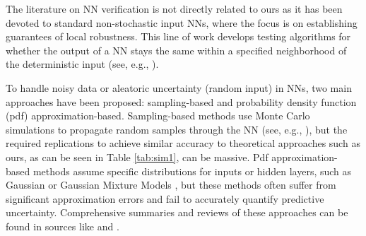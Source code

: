 \begin{comment}
To accommodate noisy data or aleatoric uncertainty (random input) in NNs directly, sampling-based and pdf approximation-based methods have been proposed. The former propagate randomness by mapping a set of samples through the NN based on which either features (e.g. moments) of the output distribution or the output distribution itself is derived. Monte Carlo simulation is used to draw random samples from the input  distribution, which are consequently propagated through the neural network to aggregate an output distribution. The training of large NNs is already computationally costly, and repeating this process a large number of times compounds the computational complexity without addressing the fundamental issue of the noise in the data deriving from their being a sample from a much larger population 
(see, e.g., \citet{Abdelazizetal2015,Jietal2020}). The core idea of pdf approximation-based methods is to assume the input, or the hidden layers of a NN have specific distributions. For example, \citet{Abdelazizetal2015} assume the distribution in each layer to be Gaussian and study their propagation through sigmoid NNs. \citet{ZhangShin2021} approximate input distributions with Gaussian Mixture Models. 
However, these methods suffer from significant approximation errors and are unable to accurately quantify predictive uncertainty in the NN output due to restrictive assumptions about the distributions in the input, their parameters, and hidden, or output layer. %
A summary of approaches to uncertainty estimation in neural networks can be found in \cite{Sickingetal2022} and a review in \cite{Gawlikowskietal2023}. 
\end{comment}

The literature on NN verification is not directly related to ours as it has been devoted to standard non-stochastic input NNs, where the focus is on establishing guarantees of local robustness. This line of work develops testing algorithms for whether the output of a NN stays the same within a specified neighborhood of the deterministic input (see, e.g., \citet{Gowaletal_2018,Xuetal_2020,Zhangetal2018,Zhangetal2020,Shietal2024,Buneletal_2019,Ferrarietal_2022,Katzetal_2017,Katzetal_2019,Wuetal_2024}). 

To handle noisy data or aleatoric uncertainty (random input) in NNs, two main approaches have been proposed: sampling-based and probability density function (pdf) approximation-based. Sampling-based methods use Monte Carlo simulations to propagate random samples through the NN (see, e.g., \citet{Abdelazizetal2015,Jietal2020}), but the required replications to achieve similar accuracy to theoretical approaches such as ours, as can be seen in Table \ref{tab:sim1}, can be massive. Pdf approximation-based methods assume specific distributions for inputs or hidden layers, such as Gaussian \cite{Abdelazizetal2015} or Gaussian Mixture Models \cite{ZhangShin2021}, but these methods often suffer from significant approximation errors and fail to accurately quantify predictive uncertainty. Comprehensive summaries and reviews of these approaches can be found in sources like \citet{Sickingetal2022} and  \citet{Gawlikowskietal2023}.


